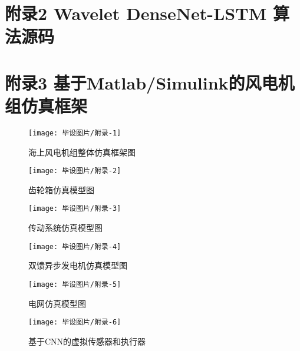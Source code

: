 {    \section{附录2 Wavelet DenseNet-LSTM 算法源码}
    
    

    \section{附录3 基于Matlab/Simulink的风电机组仿真框架 }

    \begin{figure}[H]
        \centering
        \texttt{[image: 毕设图片/附录-1]}
        \caption{海上风电机组整体仿真框架图}
        \label{fig:附录-1}
    \end{figure}

    \begin{figure}[H]
        \centering
        \texttt{[image: 毕设图片/附录-2]}
        \caption{齿轮箱仿真模型图}
        \label{fig:附录-2}
    \end{figure}

    \begin{figure}[H]
        \centering
        \texttt{[image: 毕设图片/附录-3]}
        \caption{传动系统仿真模型图}
        \label{fig:附录-3}
    \end{figure}

    \begin{figure}[H]
        \centering
        \texttt{[image: 毕设图片/附录-4]}
        \caption{双馈异步发电机仿真模型图}
        \label{fig:附录-4}
    \end{figure}

    \begin{figure}[H]
        \centering
        \texttt{[image: 毕设图片/附录-5]}
        \caption{电网仿真模型图}
        \label{fig:附录-5}
    \end{figure}

    \begin{figure}[H]
        \centering
        \texttt{[image: 毕设图片/附录-6]}
        \caption{基于CNN的虚拟传感器和执行器}
        \label{fig:附录-6}
    \end{figure}

}